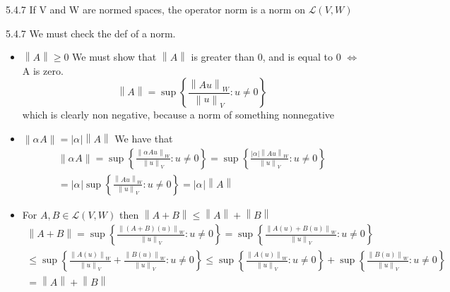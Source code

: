 \documentclass[a4paper,norsk]{article}
\renewcommand{\geq}{\geqslant}
\renewcommand{\leq}{\leqslant}
\begin{document}
\begin{propositionbox}{5.4.7}{}
If V and W are normed spaces, the operator norm is a norm on $\mathcal{L} \left( V, W \right)  $

\begin{proofbox}{5.4.7}{}
    We must check the def of a norm.
    \begin{itemize}
        \item[i)] $ \left\lVert A \right\rVert \geq 0 $ 
        We must show that $ \left\lVert A \right\rVert  $ is greater than 0, and is equal to 0 $ \iff $ A is zero.
        \[
            \left\lVert A \right\rVert = \sup \left\{ \frac{ \left\lVert Au \right\rVert _W }{ \left\lVert u \right\rVert _V } : u \neq 0 \right\} 
        \]
        which is clearly non negative, because a norm of something nonnegative
        \item[ii)] $ \left\lVert \alpha_{}^{} A \right\rVert  = \left| \alpha_{}^{}      \right| \left\lVert A \right\rVert   $ 
        We have that 
        \begin{align*}
            \left\lVert \alpha_{}^{} A \right\rVert = \sup \left\{ \frac{ \left\lVert \alpha_{}^{} Au \right\rVert_W  }{ \left\lVert u \right\rVert_V } : u \neq 0 \right\} = \sup \left\{ \frac{ \left| \alpha_{}^{}  \right| \left\lVert Au \right\rVert_W   }{ \left\lVert u \right\rVert _V } : u \neq 0 \right\} \\
            = \left| \alpha_{}^{}  \right| \sup \left\{ \frac{ \left\lVert Au \right\rVert _W }{ \left\lVert u \right\rVert _V } : u \neq 0 \right\}  = \left| \alpha_{}^{}  \right| \left\lVert A \right\rVert  
        \end{align*}

        \item[iii)] For $ A, B \in  \mathcal{L} \left( V, W \right)  $ then $ \left\lVert A+B \right\rVert \leq \left\lVert A \right\rVert + \left\lVert B \right\rVert  $ 
        \begin{align*}
            \left\lVert A + B \right\rVert = \sup \left\{ \frac{ \left\lVert \left( A+B \right) \left( u \right)  \right\rVert_W  }{ \left\lVert u \right\rVert _V } : u \neq 0 \right\} = \sup \left\{ \frac{ \left\lVert A \left( u \right) + B \left( u \right)   \right\rVert_W  }{ \left\lVert u \right\rVert _V } : u \neq 0 \right\} \\
            \leq  \sup \left\{ \frac{ \left\lVert A \left( u \right)  \right\rVert_W }{ \left\lVert u \right\rVert _V } + \frac{ \left\lVert B \left( u \right)  \right\rVert_W  }{ \left\lVert u \right\rVert _V } : u \neq 0  \right\} \leq  \sup \left\{ \frac{ \left\lVert A \left( u \right)  \right\rVert_W  }{ \left\lVert u \right\rVert _V } : u \neq 0 \right\} + \sup \left\{ \frac{ \left\lVert B \left( u \right)  \right\rVert_W  }{ \left\lVert u \right\rVert _V } : u \neq 0 \right\} \\
            = \left\lVert A\right\rVert + \left\lVert B \right\rVert 
        \end{align*}
        

\end{itemize}
\end{proofbox}
\end{propositionbox}
\end{document}
